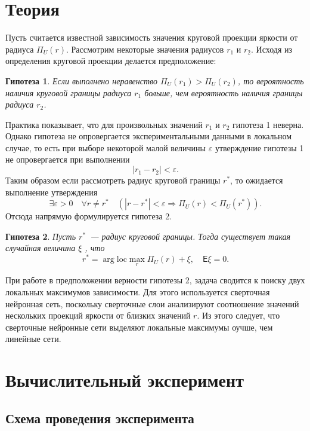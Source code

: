 \documentclass[12pt, twoside]{article}
\newtheorem{hop}{Гипотеза}
\begin{document}
\section{Теория}

Пусть считается известной зависимость значения круговой проекции яркости от радиуса $\Pi_U(r)$. Рассмотрим некоторые значения радиусов $r_1$ и $r_2$. Исходя из определения круговой проекции делается предположение:
\begin{hop}
Если выполнено неравенство $\Pi_U(r_1) > \Pi_U(r_2)$, то вероятность наличия круговой границы радиуса $r_1$ больше, чем вероятность наличия границы радиуса $r_2$.
\end{hop}

Практика показывает, что для произвольных значений $r_1$ и $r_2$ гипотеза 1 неверна. Однако гипотеза не опровергается экспериментальными данными в локальном случае, то есть при выборе некоторой малой величины $\varepsilon$ утверждение гипотезы 1 не опровергается при выполнении
\[
|r_1-r_2| < \varepsilon.
\]
Таким образом если рассмотреть радиус круговой границы $r^*$, то ожидается выполнение утверждения
\[
\exists \varepsilon > 0 \quad \forall r \neq r^* \quad \left(|r-r^*| < \varepsilon \Longrightarrow \Pi_U(r) < \Pi_U(r^*)\right).
\]
Отсюда напрямую формулируется гипотеза 2.

\begin{hop}
Пусть $r^*$~--- радиус круговой границы. Тогда существует такая случайная величина $\xi$ , что
\[
 r^* = \arg \text{loc}\max\limits_{r}\Pi_U(r) + \xi, \quad \mathsf{E}\xi=0.
\]
\end{hop}

При работе в предположении верности гипотезы 2, задача сводится к поиску двух локальных максимумов зависимости. Для этого используется сверточная нейронная сеть, поскольку сверточные слои анализируют соотношение значений нескольких проекций яркости от близких значений $r$. Из этого следует, что сверточные нейронные сети выделяют локальные максимумы оучше, чем линейные сети.

\section{Вычислительный эксперимент}

\subsection{Схема проведения эксперимента}
\end{document}
